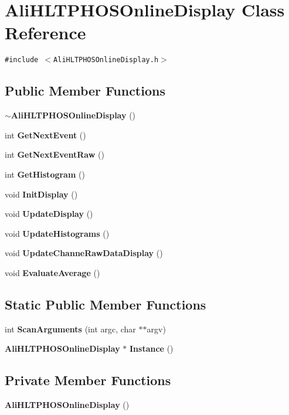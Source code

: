 \section{Ali\-HLTPHOSOnline\-Display Class Reference}
\label{classAliHLTPHOSOnlineDisplay}
{\tt \#include $<$Ali\-HLTPHOSOnline\-Display.h$>$}

\subsection*{Public Member Functions}
\begin{CompactItemize}
\item 
{\bf $\sim$Ali\-HLTPHOSOnline\-Display} ()
\item 
int {\bf Get\-Next\-Event} ()
\item 
int {\bf Get\-Next\-Event\-Raw} ()
\item 
int {\bf Get\-Histogram} ()
\item 
void {\bf Init\-Display} ()
\item 
void {\bf Update\-Display} ()
\item 
void {\bf Update\-Histograms} ()
\item 
void {\bf Update\-Channe\-Raw\-Data\-Display} ()
\item 
void {\bf Evaluate\-Average} ()
\end{CompactItemize}
\subsection*{Static Public Member Functions}
\begin{CompactItemize}
\item 
int {\bf Scan\-Arguments} (int argc, char $\ast$$\ast$argv)
\item 
{\bf Ali\-HLTPHOSOnline\-Display} $\ast$ {\bf Instance} ()
\end{CompactItemize}
\subsection*{Private Member Functions}
\begin{CompactItemize}
\item 
{\bf Ali\-HLTPHOSOnline\-Display} ()
\end{CompactItemize}
